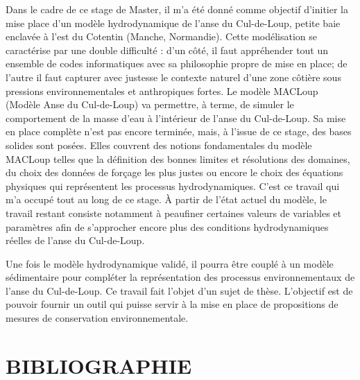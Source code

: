 \documentclass[10pt,a4paper,titlepage]{article}
\begin{document}
Dans le cadre de ce stage de Master, il m’a été donné comme objectif d’initier la mise place d’un modèle hydrodynamique de l’anse du Cul-de-Loup, petite baie enclavée à l’est du Cotentin (Manche, Normandie).
Cette modélisation se caractérise par une double difficulté : d’un côté, il faut appréhender tout un ensemble de codes informatiques avec sa philosophie propre de mise en place; de l’autre il faut capturer avec justesse le contexte naturel d’une zone côtière sous pressions environnementales et anthropiques fortes.
Le modèle MACLoup (Modèle Anse du Cul-de-Loup) va permettre, à terme, de simuler le comportement de la masse d’eau à l’intérieur de l’anse du Cul-de-Loup.
Sa mise en place complète n’est pas encore terminée, mais, à l’issue de ce stage, des bases solides sont posées.
Elles couvrent des notions fondamentales du modèle MACLoup telles que la définition des bonnes limites et résolutions des domaines, du choix des données de forçage les plus justes ou encore le choix des équations physiques qui représentent les processus hydrodynamiques. 
C’est ce travail qui m’a occupé tout au long de ce stage.
À partir de l'état actuel du modèle, le travail restant consiste notamment à peaufiner certaines valeurs de variables et paramètres afin de s’approcher encore plus des conditions hydrodynamiques réelles de l’anse du Cul-de-Loup.

Une fois le modèle hydrodynamique validé, il pourra être couplé à un modèle sédimentaire pour compléter la représentation des processus environnementaux de l'anse du Cul-de-Loup.
Ce travail fait l'objet d'un sujet de thèse.
L'objectif est de pouvoir fournir un outil qui puisse servir à la mise en place de propositions de mesures de conservation environnementale.

\newpage
\section{BIBLIOGRAPHIE}
%
%
\printbibliography
\end{document}
